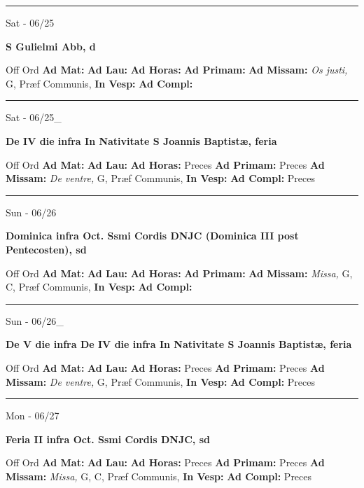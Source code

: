 \documentclass[letterpaper, 10pt]{article}
\begin{document}
\hrule
\begin{center}
Sat - 06/25
\end{center}\textbf{ \large S Gulielmi Abb, \textnormal{\normalsize d}}
\begin{justify}
Off Ord
\textbf{Ad Mat: }
\textbf{Ad Lau: }
\textbf{Ad Horas: }
\textbf{Ad Primam: }
\textbf{Ad Missam:} \textit{Os justi, } G, Præf Communis, 
\textbf{In Vesp: }
\textbf{Ad Compl: }\end{justify}



\hrule
\begin{center}
Sat - 06/25\_
\end{center}\textbf{ \large De IV die infra In Nativitate S Joannis Baptistæ, \textnormal{\normalsize feria}}
\begin{justify}
Off Ord
\textbf{Ad Mat: }
\textbf{Ad Lau: }
\textbf{Ad Horas: }Preces
\textbf{Ad Primam: }Preces
\textbf{Ad Missam:} \textit{De ventre, } G, Præf Communis, 
\textbf{In Vesp: }
\textbf{Ad Compl: }Preces\end{justify}



\hrule
\begin{center}
Sun - 06/26
\end{center}\textbf{ \large Dominica infra Oct. Ssmi Cordis DNJC (Dominica III post Pentecosten), \textnormal{\normalsize sd}}
\begin{justify}
Off Ord
\textbf{Ad Mat: }
\textbf{Ad Lau: }
\textbf{Ad Horas: }
\textbf{Ad Primam: }
\textbf{Ad Missam:} \textit{Missa, } G, C, Præf Communis, 
\textbf{In Vesp: }
\textbf{Ad Compl: }\end{justify}



\hrule
\begin{center}
Sun - 06/26\_
\end{center}\textbf{ \large De V die infra De IV die infra In Nativitate S Joannis Baptistæ, \textnormal{\normalsize feria}}
\begin{justify}
Off Ord
\textbf{Ad Mat: }
\textbf{Ad Lau: }
\textbf{Ad Horas: }Preces
\textbf{Ad Primam: }Preces
\textbf{Ad Missam:} \textit{De ventre, } G, Præf Communis, 
\textbf{In Vesp: }
\textbf{Ad Compl: }Preces\end{justify}



\hrule
\begin{center}
Mon - 06/27
\end{center}\textbf{ \large Feria II infra Oct. Ssmi Cordis DNJC, \textnormal{\normalsize sd}}
\begin{justify}
Off Ord
\textbf{Ad Mat: }
\textbf{Ad Lau: }
\textbf{Ad Horas: }Preces
\textbf{Ad Primam: }Preces
\textbf{Ad Missam:} \textit{Missa, } G, C, Præf Communis, 
\textbf{In Vesp: }
\textbf{Ad Compl: }Preces\end{justify}
\end{document}
